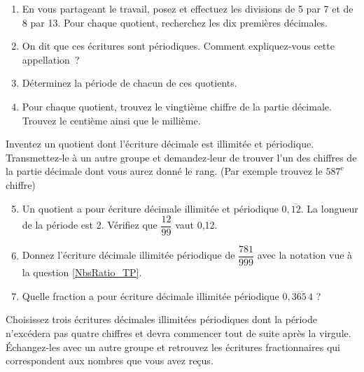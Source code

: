
\begin{TP}

\begin{enumerate}
 \item En vous partageant le travail, posez et effectuez les divisions de 5 par 7 et de 8 par 13. Pour chaque quotient, recherchez les dix premières décimales.
 \item On dit que ces écritures sont périodiques. Comment expliquez‑vous cette appellation ?
 \item Déterminez la période de chacun de ces quotients.
 \item Pour chaque quotient, trouvez le vingtième chiffre de la partie décimale. Trouvez le centième ainsi que le millième.
 \end{enumerate}

Inventez un quotient dont l'écriture décimale est illimitée et périodique. Transmettez‑le à un autre groupe et demandez‑leur de trouver l'un des chiffres de la partie décimale dont vous aurez donné le rang. (Par exemple trouvez le $587^\text{e}$ chiffre)


\begin{enumerate}
 \setcounter{enumi}{4}
 \item Un quotient a pour écriture décimale illimitée et périodique $0,\overline{12}$. La longueur de la période est 2. Vérifiez que $\dfrac{12}{99}$ vaut 0,12. \label{NbsRatio_TP}
 \item Donnez l'écriture décimale illimitée périodique de $\dfrac{781}{999}$ avec la notation vue à la question \ref{NbsRatio_TP}.
 \item Quelle fraction a pour écriture décimale illimitée périodique $0,\overline{365\,4}$ ?
 \end{enumerate}

Choisissez trois écritures décimales illimitées périodiques dont la période n'excédera pas quatre chiffres et devra commencer tout de suite après la virgule. \\[0.5em]
Échangez‑les avec un autre groupe et retrouvez les écritures fractionnaires qui correspondent aux nombres que vous avez reçus.

\end{TP}


